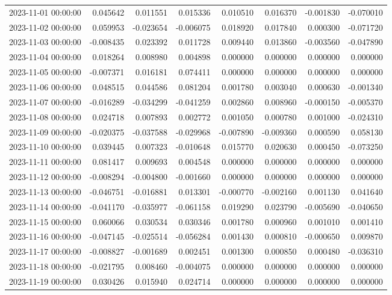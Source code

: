 \begin{tabular}{lrrrrrrr}
2023-11-01 00:00:00 & 0.045642 & 0.011551 & 0.015336 & 0.010510 & 0.016370 & -0.001830 & -0.070010 \\
2023-11-02 00:00:00 & 0.059953 & -0.023654 & -0.006075 & 0.018920 & 0.017840 & 0.000300 & -0.071720 \\
2023-11-03 00:00:00 & -0.008435 & 0.023392 & 0.011728 & 0.009440 & 0.013860 & -0.003560 & -0.047890 \\
2023-11-04 00:00:00 & 0.018264 & 0.008980 & 0.004898 & 0.000000 & 0.000000 & 0.000000 & 0.000000 \\
2023-11-05 00:00:00 & -0.007371 & 0.016181 & 0.074411 & 0.000000 & 0.000000 & 0.000000 & 0.000000 \\
2023-11-06 00:00:00 & 0.048515 & 0.044586 & 0.081204 & 0.001780 & 0.003040 & 0.000630 & -0.001340 \\
2023-11-07 00:00:00 & -0.016289 & -0.034299 & -0.041259 & 0.002860 & 0.008960 & -0.000150 & -0.005370 \\
2023-11-08 00:00:00 & 0.024718 & 0.007893 & 0.002772 & 0.001050 & 0.000780 & 0.001000 & -0.024310 \\
2023-11-09 00:00:00 & -0.020375 & -0.037588 & -0.029968 & -0.007890 & -0.009360 & 0.000590 & 0.058130 \\
2023-11-10 00:00:00 & 0.039445 & 0.007323 & -0.010648 & 0.015770 & 0.020630 & 0.000450 & -0.073250 \\
2023-11-11 00:00:00 & 0.081417 & 0.009693 & 0.004548 & 0.000000 & 0.000000 & 0.000000 & 0.000000 \\
2023-11-12 00:00:00 & -0.008294 & -0.004800 & -0.001660 & 0.000000 & 0.000000 & 0.000000 & 0.000000 \\
2023-11-13 00:00:00 & -0.046751 & -0.016881 & 0.013301 & -0.000770 & -0.002160 & 0.001130 & 0.041640 \\
2023-11-14 00:00:00 & -0.041170 & -0.035977 & -0.061158 & 0.019290 & 0.023790 & -0.005690 & -0.040650 \\
2023-11-15 00:00:00 & 0.060066 & 0.030534 & 0.030346 & 0.001780 & 0.000960 & 0.001010 & 0.001410 \\
2023-11-16 00:00:00 & -0.047145 & -0.025514 & -0.056284 & 0.001430 & 0.000810 & -0.000650 & 0.009870 \\
2023-11-17 00:00:00 & -0.008827 & -0.001689 & 0.002451 & 0.001300 & 0.000850 & 0.000480 & -0.036310 \\
2023-11-18 00:00:00 & -0.021795 & 0.008460 & -0.004075 & 0.000000 & 0.000000 & 0.000000 & 0.000000 \\
2023-11-19 00:00:00 & 0.030426 & 0.015940 & 0.024714 & 0.000000 & 0.000000 & 0.000000 & 0.000000 \\

\end{tabular}
